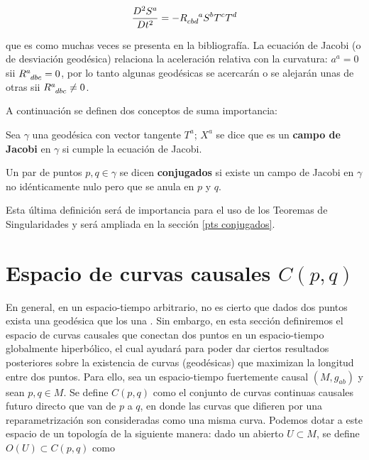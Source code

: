 $$
\frac{D^2S^a}{Dt^2}=-\tensor{R}{_{cbd}^a}S^bT^cT^d
$$

que es como muchas veces se presenta en la bibliografía. La ecuación de Jacobi (o de desviación geodésica) relaciona la aceleración relativa con la curvatura: $a^a=0$ sii $\tensor{R}{^a_{dbc}}=0$, por lo tanto algunas geodésicas se acercarán o se alejarán unas de otras sii $\tensor{R}{^a_{dbc}}\neq 0$. 

A continuación se definen dos conceptos de suma importancia:

\begin{definition}
Sea $\gamma$ una geodésica con vector tangente $T^a$; $X^a$ se dice que es un \textbf{campo de Jacobi} en $\gamma$ si cumple la ecuación de Jacobi.
\end{definition}

\begin{definition}
Un par de puntos $p,q\in \gamma$ se dicen \textbf{conjugados} si existe un campo de Jacobi en $\gamma$ no idénticamente nulo pero que se anula en $p$ y $q$. 
\end{definition}

Esta última definición será de importancia para el uso de los Teoremas de Singularidades y será ampliada en la sección \ref{pts conjugados}.





\section{Espacio de curvas causales $C(p,q)$}\label{seccion Cpq}


En general, en un espacio-tiempo arbitrario, no es cierto que dados dos puntos exista una geodésica que los una \citep{Beem}. Sin embargo, en esta sección definiremos el espacio de curvas causales que conectan dos puntos en un espacio-tiempo globalmente hiperbólico, el cual ayudará para poder dar ciertos resultados posteriores sobre la existencia de curvas (geodésicas) que maximizan la longitud entre dos puntos. Para ello, sea un espacio-tiempo fuertemente causal $(M,g_{ab})$ y sean $p,q\in M$. Se define $C(p,q)$ como el conjunto de curvas continuas causales futuro directo que van de $p$ a $q$, en donde las curvas que difieren por una reparametrización son consideradas como una misma curva. Podemos dotar a este espacio de un topología de la siguiente manera: dado un abierto $U\subset M$, se define $O(U)\subset C(p,q)$ como

